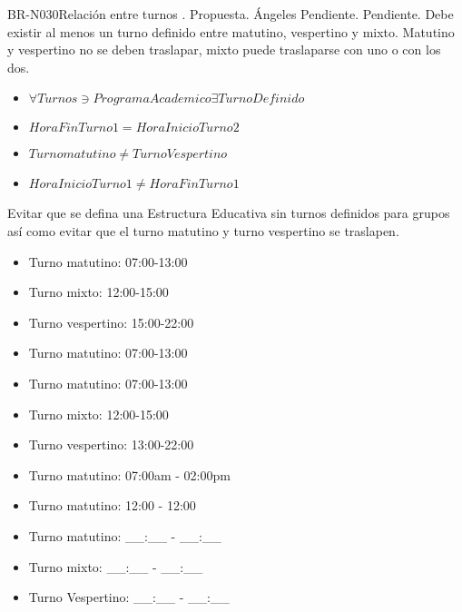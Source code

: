 \begin{BusinessRule}{BR-N030}{Relación entre turnos}
	{\bcCondition}    %
	{\btEnabler}     %
	{\blControlling}    %
	.
	\BRItem[Estado] Propuesta.
	 Ángeles
	 Pendiente.
	 Pendiente.
	\BRItem[Descripción] Debe existir al menos un turno definido entre matutino, vespertino y mixto.  Matutino y vespertino no se deben traslapar, mixto puede traslaparse con uno o con los dos.
	\BRItem[Sentencia]	\cdtEmpty
	\begin{itemize}
		\item $\forall Turnos \ni ProgramaAcademico \exists Turno Definido$
		\item $ HoraFinTurno1 = HoraInicioTurno2$
		\item $ Turno matutino \neq Turno Vespertino $
		\item $ HoraInicioTurno1 \neq HoraFinTurno1 $
	\end{itemize}
	\BRItem[Motivación] Evitar que se defina una Estructura Educativa sin turnos definidos para grupos así como evitar que el turno matutino y turno vespertino se traslapen.
	 \cdtEmpty
	\begin{itemize}
			\item Turno matutino: 07:00-13:00
			\item Turno mixto: 12:00-15:00
			\item Turno vespertino: 15:00-22:00
	\end{itemize}
	 \cdtEmpty
	\begin{itemize}
		\item Turno matutino: 07:00-13:00
	\end{itemize}
		 \cdtEmpty
	\begin{itemize}
		\item Turno matutino: 07:00-13:00
		\item Turno mixto: 12:00-15:00
		\item Turno vespertino: 13:00-22:00
	\end{itemize}	
	 \cdtEmpty
		\begin{itemize}
			\item Turno matutino: 07:00am - 02:00pm
			\item Turno matutino: 12:00 - 12:00
		\end{itemize}
		 \cdtEmpty
	\begin{itemize}
		\item Turno matutino: \_\_:\_\_ - \_\_:\_\_
		\item Turno mixto: \_\_:\_\_ - \_\_:\_\_
		\item Turno Vespertino: \_\_:\_\_ - \_\_:\_\_
	\end{itemize}
\end{BusinessRule}

